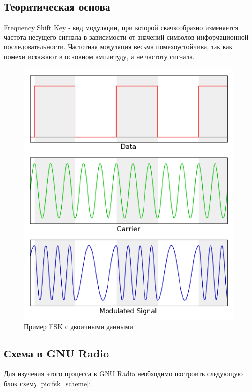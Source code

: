 \subsection{Теоритическая основа}

\qquad Frequency Shift Key - вид модуляции, при которой скачкообразно изменяется частота несущего сигнала в зависимости от значений символов информационной последовательности. Частотная модуляция весьма помехоустойчива, так как помехи искажают в основном амплитуду, а не частоту сигнала.

\begin{figure}[H]
	\begin{center}
		\includegraphics[scale=1]{fig/lab12/lab12_01.png}
		\caption{Пример FSK с двоичными данными}
	\end{center}
\end{figure}

\subsection{Схема в GNU Radio}    
    Для изучения этого процесса в GNU Radio\cite{gnuradio} необходимо построить следующую блок схему \ref{pic:fsk_scheme}:
    
